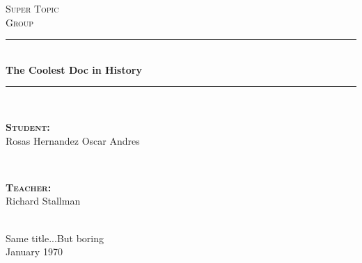 \documentclass[12pt, fleqn]{report}
\author{Oscar Andrés Rosas}
\begin{document}
\begin{titlepage}

    \center
    \textsc{\Large Super Topic}\\[0.5cm] 
    \textsc{\large Group}\\[1.5cm]

    \rule{\linewidth}{0.5mm} \\[1.0cm]
        { \huge \bfseries The Coolest Doc in History}\\[1.0cm] 
    \rule{\linewidth}{0.5mm} \\[2.0cm]
     
    \begin{minipage}{0.4\textwidth}
        \begin{flushleft} \large
            \textbf{\textsc{Student:}}\\
            Rosas Hernandez Oscar Andres
        \end{flushleft}
    \end{minipage}
    ~
    \begin{minipage}{0.4\textwidth}
        \begin{flushright} \large
            \textbf{\textsc{Teacher: }}\\
            Richard Stallman
        \end{flushright}
    \end{minipage}\\[3,5cm]

    {\LARGE Same title...But boring}\\[4cm] 
    
    
    {\large January 1970}\\[2cm] 

    \vfill

\end{titlepage}
\end{document}
